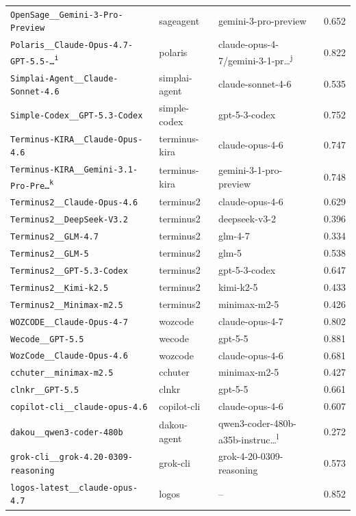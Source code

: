 \documentclass{article}
\begin{document}
\begin{center}
\begin{longtable}{lllc}
\texttt{OpenSage\_\_Gemini-3-Pro-Preview} & sageagent & gemini-3-pro-preview & 0.652 \\
\texttt{Polaris\_\_Claude-Opus-4.7-GPT-5.5-\ldots\textsuperscript{i}} & polaris & claude-opus-4-7/gemini-3-1-pr\ldots\textsuperscript{j} & 0.822 \\
\texttt{Simplai-Agent\_\_Claude-Sonnet-4.6} & simplai-agent & claude-sonnet-4-6 & 0.535 \\
\texttt{Simple-Codex\_\_GPT-5.3-Codex} & simple-codex & gpt-5-3-codex & 0.752 \\
\texttt{Terminus-KIRA\_\_Claude-Opus-4.6} & terminus-kira & claude-opus-4-6 & 0.747 \\
\texttt{Terminus-KIRA\_\_Gemini-3.1-Pro-Pre\ldots\textsuperscript{k}} & terminus-kira & gemini-3-1-pro-preview & 0.748 \\
\texttt{Terminus2\_\_Claude-Opus-4.6} & terminus2 & claude-opus-4-6 & 0.629 \\
\texttt{Terminus2\_\_DeepSeek-V3.2} & terminus2 & deepseek-v3-2 & 0.396 \\
\texttt{Terminus2\_\_GLM-4.7} & terminus2 & glm-4-7 & 0.334 \\
\texttt{Terminus2\_\_GLM-5} & terminus2 & glm-5 & 0.538 \\
\texttt{Terminus2\_\_GPT-5.3-Codex} & terminus2 & gpt-5-3-codex & 0.647 \\
\texttt{Terminus2\_\_Kimi-k2.5} & terminus2 & kimi-k2-5 & 0.433 \\
\texttt{Terminus2\_\_Minimax-m2.5} & terminus2 & minimax-m2-5 & 0.426 \\
\texttt{WOZCODE\_\_Claude-Opus-4-7} & wozcode & claude-opus-4-7 & 0.802 \\
\texttt{Wecode\_\_GPT-5.5} & wecode & gpt-5-5 & 0.881 \\
\texttt{WozCode\_\_Claude-Opus-4.6} & wozcode & claude-opus-4-6 & 0.681 \\
\texttt{cchuter\_\_minimax-m2.5} & cchuter & minimax-m2-5 & 0.427 \\
\texttt{clnkr\_\_GPT-5.5} & clnkr & gpt-5-5 & 0.661 \\
\texttt{copilot-cli\_\_claude-opus-4.6} & copilot-cli & claude-opus-4-6 & 0.607 \\
\texttt{dakou\_\_qwen3-coder-480b} & dakou-agent & qwen3-coder-480b-a35b-instruc\ldots\textsuperscript{l} & 0.272 \\
\texttt{grok-cli\_\_grok-4.20-0309-reasoning} & grok-cli & grok-4-20-0309-reasoning & 0.573 \\
\texttt{logos-latest\_\_claude-opus-4.7} & logos & -- & 0.852 \\

\end{longtable}
\end{center}
\end{document}
